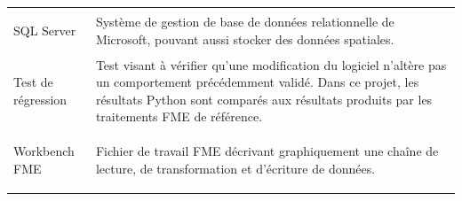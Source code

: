 \begin{longtable}{
    @{}
    >{\bfseries\raggedright\arraybackslash}p{}
    >{\raggedright\arraybackslash}p{}
    @{}
}
SQL Server
&
Système de gestion de base de données relationnelle de Microsoft, pouvant aussi
stocker des données spatiales.
\\

Test de régression
&
Test visant à vérifier qu'une modification du logiciel n'altère pas un
comportement précédemment validé. Dans ce projet, les résultats Python sont
comparés aux résultats produits par les traitements FME de référence.
\\

Workbench FME
&
Fichier de travail FME décrivant graphiquement une chaîne de lecture, de
transformation et d'écriture de données.
\\

\end{longtable}

\normalsize
